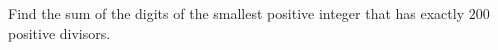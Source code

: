 Find the sum of the digits of the smallest positive integer that has exactly $200$ positive divisors.
